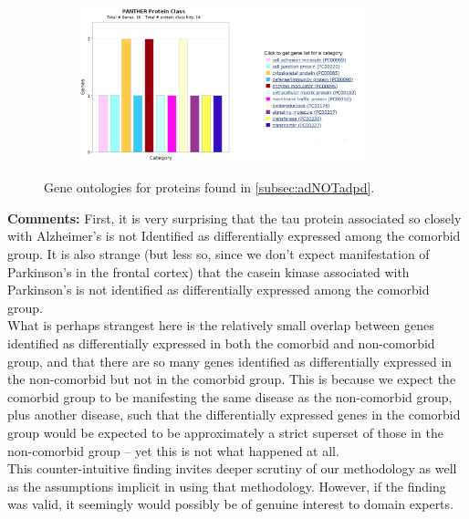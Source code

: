 \begin{figure}[H]
\begin{subfigure}[b]{0.5\linewidth}
\end{subfigure}
\begin{subfigure}[b]{0.5\linewidth}
\centering
\includegraphics[width=0.9\textwidth]{./Figures/GO/adNOTadpd/adNOTadpd4}\par
\end{subfigure}%
\begin{caption}
  {Gene ontologies for proteins found in \ref{subsec:adNOTadpd}.}
\end{caption}
\end{figure}

\textbf{Comments:} First, it is very surprising that the tau protein associated so closely with Alzheimer's is not Identified as differentially expressed among the comorbid group. It is also strange (but less so, since we don't expect manifestation of Parkinson's in the frontal cortex) that the casein kinase associated with Parkinson's is not identified as differentially expressed among the comorbid group.\\

What is perhaps strangest here is the relatively small overlap between genes identified as differentially expressed in both the comorbid and non-comorbid group, and that there are so many genes identified as differentially expressed in the non-comorbid but not in the comorbid group. This is because we expect the comorbid group to be manifesting the same disease as the non-comorbid group, plus another disease, such that the differentially expressed genes in the comorbid group would be expected to be approximately a strict superset of those in the non-comorbid group -- yet this is not what happened at all.\\

This counter-intuitive finding invites deeper scrutiny of our methodology as well as the assumptions implicit in using that methodology. However, if the finding was valid, it seemingly would possibly be of genuine interest to domain experts.\\

